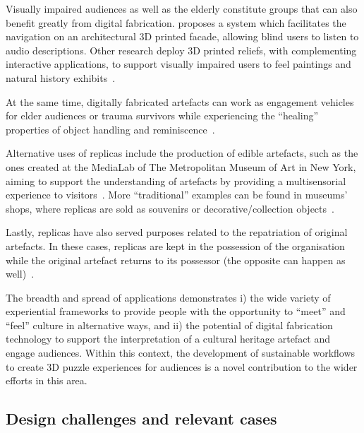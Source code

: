 \documentclass[acmlarge,screen,dvipsnames]{acmart}
\begin{document}
Visually impaired audiences as well as the elderly constitute groups
that can also benefit greatly from digital
fabrication. \cite{DAgnano2015} proposes a system which facilitates
the navigation on an architectural 3D printed facade, allowing blind
users to listen to audio descriptions. Other research deploy 3D
printed reliefs, with complementing interactive applications, to
support visually impaired users to feel paintings and natural history
exhibits~\cite{Reichinger2016a,Samaroudi2017}.

At the same time, digitally fabricated artefacts can work as
engagement vehicles for elder audiences or trauma survivors while
experiencing the ``healing'' properties of object handling and
reminiscence~\cite{PleaseTouch2016}.

Alternative uses of replicas include the production of edible
artefacts, such as the ones created at the MediaLab of The
Metropolitan Museum of Art in New York, aiming to support the
understanding of artefacts by providing a multisensorial experience to
visitors~\cite{Tang2015}. More ``traditional'' examples can be found
in museums' shops, where replicas are sold as souvenirs or
decorative/collection objects~\cite{Young2017}.

Lastly, replicas have also served purposes related to the repatriation
of original artefacts. In these cases, replicas are kept in the
possession of the organisation while the original artefact returns to
its possessor (the opposite can happen as well)~\cite{Hollinger2013}.
 
The breadth and spread of applications demonstrates i) the wide
variety of experiential frameworks to provide people with the
opportunity to ``meet'' and ``feel'' culture in alternative ways, and
ii) the potential of digital fabrication technology to support the
interpretation of a cultural heritage artefact and engage
audiences. Within this context, the development of sustainable
workflows to create 3D puzzle experiences for audiences is a novel
contribution to the wider efforts in this area.

\subsection{Design challenges and relevant cases}
 
\end{document}
